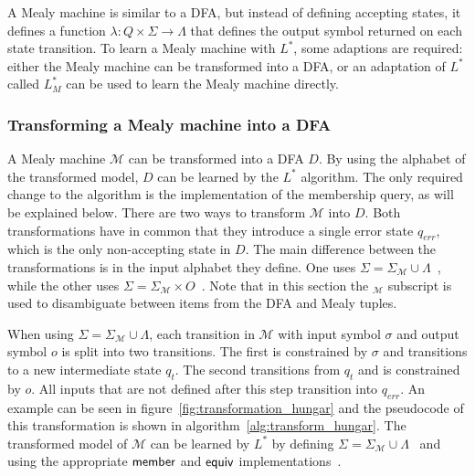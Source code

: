 A Mealy machine is similar to a DFA, but instead of defining accepting states,
it defines a function $\lambda: Q \times \Sigma \to \Lambda$ that defines
the output symbol returned on each state transition. To learn a Mealy machine
with $L^*$, some adaptions are required: either the Mealy machine can be
transformed into a DFA, or an adaptation of $L^*$ called $L^*_{M}$ can be used
to learn the Mealy machine directly.

\subsubsection {Transforming a Mealy machine into a DFA}

A Mealy machine $\mathcal{M}$ can be transformed into a DFA $D$. By using the
alphabet of the transformed model, $D$ can be learned by the $L^*$ algorithm.
The only required change to the algorithm is the implementation of the
membership query, as will be explained below. There are two ways to transform
$\mathcal{M}$ into $D$. Both transformations have in common that they introduce
a single error state $q_{err}$, which is the only non-accepting state in $D$.
The main difference between the transformations is in the input alphabet they
define. One uses $\Sigma = \Sigma_\mathcal{M} \cup \Lambda$~\cite{Hungar2003},
while the other uses $\Sigma = \Sigma_\mathcal{M} \times O$~\cite{Makinen2001}.
Note that in this section the $_{\mathcal{M}}$ subscript is used to disambiguate
between items from the DFA and Mealy tuples.


When using $\Sigma = \Sigma_\mathcal{M} \cup \Lambda$, each transition in
$\mathcal{M}$ with input symbol $\sigma$ and output symbol $o$ is split into two
transitions. The first is constrained by $\sigma$ and transitions to a new
intermediate state $q_t$. The second transitions from $q_t$ and is constrained
by $o$. All inputs that are not defined after this step transition into
$q_{err}$. An example can be seen in figure~\ref{fig:transformation_hungar} and
the pseudocode of this transformation is shown in algorithm~\ref{alg:transform_hungar}. The transformed model of $\mathcal{M}$ can be
learned by $L^*$ by defining $\Sigma = \Sigma_\mathcal{M} \cup \Lambda$~\cite{Shahbaz2009} and using the appropriate $\mathsf{member}$ and $\mathsf{equiv}$ implementations~\cite{Hungar2003,Niese2003}.


